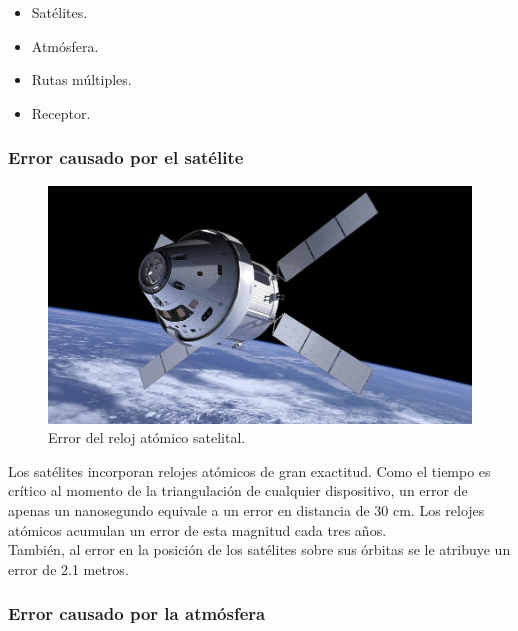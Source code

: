 \begin{itemize}
	\item Satélites.
	\item Atmósfera.
	\item Rutas múltiples.
	\item Receptor.
\end{itemize} 

\subsubsection{Error causado por el satélite}

\begin{figure}[!ht]
\centering
\includegraphics[scale=0.23]{Figures/Sat}
\caption[Error del reloj atómico satelital.]{Error del reloj atómico satelital\footnotemark.}
\label{fig:ErrSat}
\end{figure}


Los satélites incorporan relojes atómicos de gran exactitud. Como el tiempo es crítico al momento de la triangulación de cualquier dispositivo, un error de apenas un nanosegundo equivale a un error en distancia de 30 cm. Los relojes atómicos acumulan un error de esta magnitud cada tres años. \\

También, al error en la posición de los satélites sobre sus órbitas se le atribuye un error de 2.1 metros.

\subsubsection{Error causado por la atmósfera}

